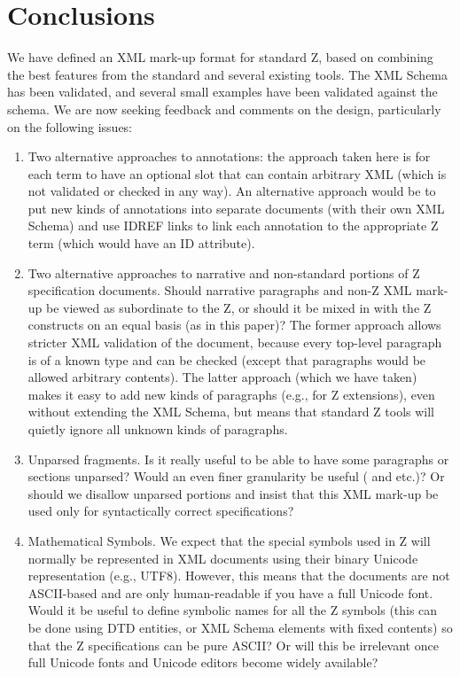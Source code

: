 \documentclass{llncs}  %
\begin{document}


\section{Conclusions}

We have defined an XML mark-up format for standard Z, based on
combining the best features from the standard and several existing 
tools.  The XML Schema has been validated, and several small examples
have been validated against the schema.  We are now seeking feedback 
and comments on the design, particularly on the following issues:
\begin{enumerate}
\item Two alternative approaches to annotations: the approach taken
  here is for each term to have an optional  slot that can
  contain arbitrary XML (which is not validated or checked in any way).  
  An alternative approach would be to put new kinds of annotations into
  separate documents (with their own XML Schema) and use IDREF links
  to link each annotation to the appropriate Z term (which would have an ID
  attribute).
\item Two alternative approaches to narrative and non-standard portions of
  Z specification documents.  Should narrative paragraphs and non-Z XML
  mark-up be viewed as subordinate to the Z, or should it be mixed in
  with the Z constructs on an equal basis (as in this paper)?  The former
  approach allows stricter XML validation of the document, because every
  top-level paragraph is of a known type and can be checked (except that
   paragraphs would be allowed arbitrary contents).
  The latter approach (which we have taken) makes it easy to add new kinds
  of paragraphs 
  (e.g., for Z extensions), even without extending the XML Schema, but
  means that standard Z tools will quietly ignore all unknown kinds of
  paragraphs.
\item Unparsed fragments.  Is it really useful to be able to have some
  paragraphs or sections unparsed?  Would an even finer granularity be
  useful ( and  etc.)?  Or should we disallow
  unparsed portions and insist that this XML mark-up be used only for
  syntactically correct specifications? 
\item Mathematical Symbols.  We expect that the special symbols used in Z
  will normally be represented in XML documents using their binary Unicode
  representation (e.g., UTF8).  However, this means that the documents are
  not ASCII-based and are only human-readable if you have a full Unicode
  font.  Would it be useful to define symbolic names for all the Z symbols
  (this can be done using DTD entities, or XML Schema elements with fixed
  contents) so that the Z specifications can be pure ASCII?  Or will this
  be irrelevant once full Unicode fonts and Unicode editors become widely
  available? 
\end{enumerate}
\end{document}
